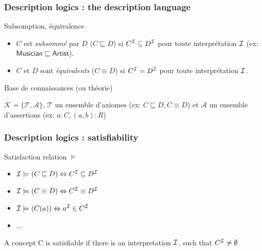 \documentclass{beamer}
\newcommand{\I}{{\cal{I}}}
\begin{document}
  \begin{frame}
 \frametitle{Description logics : the description language}
  
  
  
  
   \vspace{-0.15cm}
\begin{block}{Subsomption, équivalence}
 \begin{itemize}
 \item $C$ est \emph{subsommé} par $D$ ($C\sqsubseteq D$) si $C^\I \subseteq D^\I$ pour toute
interprétation $\I$ (ex: $\mathsf{Musician}\sqsubseteq\mathsf{Artist}$).
\item $C$ et $D$ sont \emph{équivalents} ($C \equiv D$) si $C^\I = D^\I$ pour toute
interprétation $\I$.
 \end{itemize}
 \end{block}
  \vspace{-0.15cm}
 \begin{block}{Base de connaissances (ou théorie)}
 
$\mathcal{K}=\{\mathcal{T},\mathcal{A}\}$, $\mathcal{T}$ un ensemble d'axiomes (ex: $C\sqsubseteq D, C\equiv D$) et $\mathcal{A}$ un ensemble d'assertions (ex: $a:C, (a,b):R$)
 
 \end{block}
\end{frame}


\begin{frame}
\frametitle{Description logics : satisfiability }

\begin{block}{Satisfaction relation $\models$}
\begin{itemize}
    \item $\I \models (C\sqsubseteq D) \Leftrightarrow C^\I \subseteq D^\I$
    \item $\I \models (C\equiv D)  \Leftrightarrow C^\I \equiv D^\I$
    \item $\I \models (C(a))  \Leftrightarrow a^\I \in C^\I$    
    \item ...
\end{itemize}
\end{block}
A concept C is satisfiable if there is an interpretation $\I$, such that $ C^\I \neq \emptyset$
\end{frame}
\end{document}
